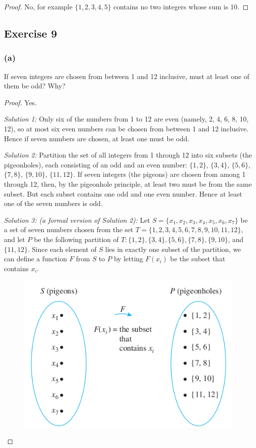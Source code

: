 \documentclass[14pt]{extarticle}
\begin{document}
\begin{proof}
No, for example \(\{1,2,3,4,5\}\) contains no two integers whose sum is 10.
\end{proof}

\subsection{Exercise 9}
\subsubsection{(a)}
If seven integers are chosen from between 1 and 12 inclusive, must at least one of them be odd? Why?

\begin{proof}
Yes.

{\it Solution 1:} Only six of the numbers from 1 to 12 are even (namely, 2, 4, 6, 8, 10, 12), so at most six even 
numbers can be chosen from between 1 and 12 inclusive. Hence if seven numbers are chosen, at least one must be odd.

{\it Solution 2:} Partition the set of all integers from 1 through 12 into six subsets (the pigeonholes), each 
consisting of an odd and an even number: \(\{1, 2\}\), \(\{3, 4\}\), \(\{5, 6\}\), \(\{7, 8\}\), \(\{9, 10\}\), 
\(\{11, 12\}\). If seven integers (the pigeons) are chosen from among 1 through 12, then, by the pigeonhole principle, 
at least two must be from the same subset. But each subset contains one odd and one even number. Hence at least one of 
the seven numbers is odd.

{\it Solution 3: (a formal version of Solution 2):} Let
\(S = \{x_1, x_2, x_3, x_4, x_5, x_6, x_7\}\) be a set of 
seven numbers chosen from the set \(T = \{1, 2, 3, 4, 5, 6, 7, 8, 9, 10, 11, 12\}\), and let \(P\) be the following 
partition of \(T: \{1, 2\}, \{3, 4\}, \{5, 6\}, \{7, 8\}, \{9, 10\}\), and \(\{11, 12\}\). Since each element of 
\(S\) lies in exactly one subset of the partition, we can define a function \(F\) from \(S\) to \(P\) by letting 
\(F(x_i)\) be the subset that contains \(x_i\).

\begin{figure}[ht!]
\centering
\includegraphics[scale=0.5]{../images/9.4.9.a.png}
\end{figure}


\end{proof}
\end{document}

